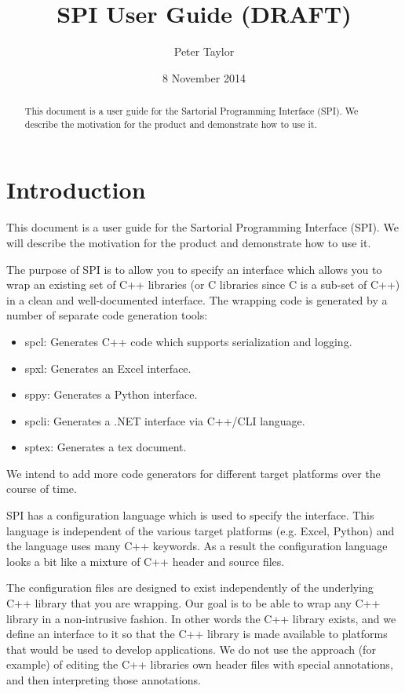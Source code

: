 \documentclass[a4paper] {article}
\author{Peter Taylor}
\date{8 November 2014}
\title{SPI User Guide (DRAFT)}
\begin{document}
\maketitle
\begin{abstract}
This document is a user guide for the Sartorial Programming Interface (SPI).
We describe the motivation for the product and demonstrate how to use it.
\end{abstract}
\tableofcontents
\section{Introduction}
This document is a user guide for the Sartorial Programming Interface (SPI).
We will describe the motivation for the product and demonstrate how to use it.

The purpose of SPI is to allow you to specify an interface which allows you to wrap an existing set of C++ libraries (or C libraries since C is a sub-set of C++) in a clean and well-documented interface.
The wrapping code is generated by a number of separate code generation tools:
\begin{itemize}
\item spcl: Generates C++ code which supports serialization and logging.
\item spxl: Generates an Excel interface.
\item sppy: Generates a Python interface.
\item spcli: Generates a .NET interface via C++/CLI language.
\item sptex: Generates a tex document.
\end{itemize}
We intend to add more code generators for different target platforms over the course of time.

SPI has a configuration language which is used to specify the interface.
This language is independent of the various target platforms (e.g. Excel, Python) and the language uses many C++ keywords.
As a result the configuration language looks a bit like a mixture of C++ header and source files.

The configuration files are designed to exist independently of the underlying C++ library that you are wrapping.
Our goal is to be able to wrap any C++ library in a non-intrusive fashion.
In other words the C++ library exists, and we define an interface to it so that the C++ library is made available to platforms that would be used to develop applications.
We do not use the approach (for example) of editing the C++ libraries own header files with special annotations, and then interpreting those annotations.
\end{document}
